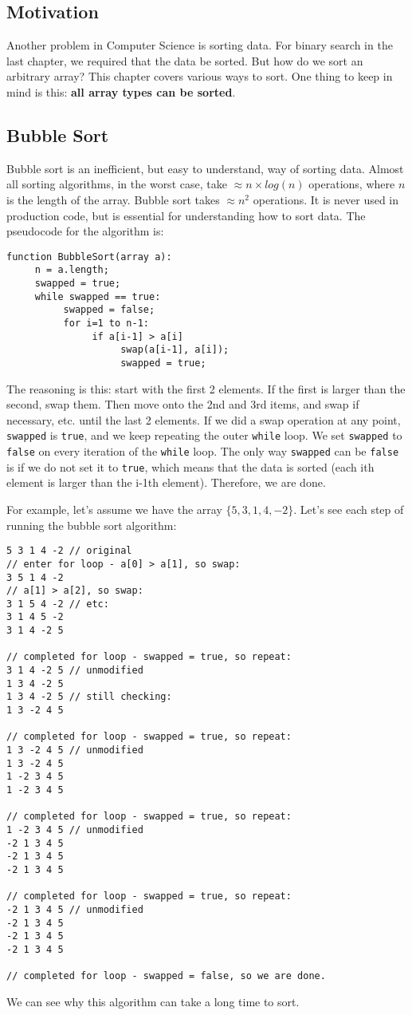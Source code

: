 
\subsection{Motivation}
Another problem in Computer Science is sorting data. For binary search in the last chapter, we required that the data be sorted. But how do we sort an arbitrary array? This chapter covers various ways to sort. One thing to keep in mind is this: \textbf{all array types can be sorted}.

\subsection{Bubble Sort}
Bubble sort is an inefficient, but easy to understand, way of sorting data. Almost all sorting algorithms, in the worst case, take $\approx n \times log(n)$ operations, where $n$ is the length of the array. Bubble sort takes $\approx n^2$ operations. It is never used in production code, but is essential for understanding how to sort data. The pseudocode for the algorithm is:
\begin{verbatim}
function BubbleSort(array a):
     n = a.length;
     swapped = true;
     while swapped == true:
          swapped = false;
          for i=1 to n-1:
               if a[i-1] > a[i]
                    swap(a[i-1], a[i]);
                    swapped = true;
\end{verbatim}
The reasoning is this: start with the first 2 elements. If the first is larger than the second, swap them. Then move onto the 2nd and 3rd items, and swap if necessary, etc. until the last 2 elements. If we did a swap operation at any point, \verb|swapped| is \verb|true|, and we keep repeating the outer \verb|while| loop. We set \verb|swapped| to \verb|false| on every iteration of the \verb|while| loop. The only way \verb|swapped| can be \verb|false| is if we do not set it to \verb|true|, which means that the data is sorted (each ith element is larger than the i-1th element). Therefore, we are done.

\par For example, let's assume we have the array $\{5, 3, 1, 4, -2\}$. Let's see each step of running the bubble sort algorithm:
\begin{verbatim}
5 3 1 4 -2 // original
// enter for loop - a[0] > a[1], so swap:
3 5 1 4 -2
// a[1] > a[2], so swap:
3 1 5 4 -2 // etc:
3 1 4 5 -2
3 1 4 -2 5

// completed for loop - swapped = true, so repeat:
3 1 4 -2 5 // unmodified
1 3 4 -2 5
1 3 4 -2 5 // still checking:
1 3 -2 4 5

// completed for loop - swapped = true, so repeat:
1 3 -2 4 5 // unmodified
1 3 -2 4 5
1 -2 3 4 5
1 -2 3 4 5

// completed for loop - swapped = true, so repeat:
1 -2 3 4 5 // unmodified
-2 1 3 4 5
-2 1 3 4 5
-2 1 3 4 5

// completed for loop - swapped = true, so repeat:
-2 1 3 4 5 // unmodified
-2 1 3 4 5
-2 1 3 4 5
-2 1 3 4 5

// completed for loop - swapped = false, so we are done.
\end{verbatim}
We can see why this algorithm can take a long time to sort.

